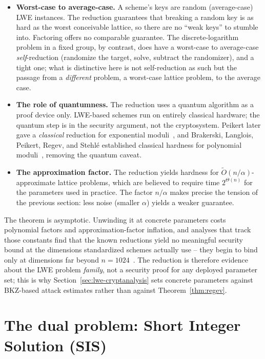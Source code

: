 \begin{itemize}
  \item \textbf{Worst-case to average-case.} A scheme's keys are random (average-case) LWE instances. The reduction guarantees that breaking a random key is as hard as the worst conceivable lattice, so there are no ``weak keys'' to stumble into. Factoring offers no comparable guarantee. The discrete-logarithm problem in a fixed group, by contrast, does have a worst-case to average-case \emph{self}-reduction (randomize the target, solve, subtract the randomizer), and a tight one; what is distinctive here is not self-reduction as such but the passage from a \emph{different} problem, a worst-case lattice problem, to the average case.
  \item \textbf{The role of quantumness.} The reduction uses a quantum algorithm as a proof device only. LWE-based schemes run on entirely classical hardware; the quantum step is in the security argument, not the cryptosystem. Peikert later gave a \emph{classical} reduction for exponential moduli~\cite{peikert2009}, and Brakerski, Langlois, Peikert, Regev, and Stehl\'{e} established classical hardness for polynomial moduli~\cite{blprs2013}, removing the quantum caveat.
  \item \textbf{The approximation factor.} The reduction yields hardness for $\widetilde{O}(n/\alpha)$-approximate lattice problems, which are believed to require time $2^{\Theta(n)}$ for the parameters used in practice. The factor $n/\alpha$ makes precise the tension of the previous section: less noise (smaller $\alpha$) yields a weaker guarantee.
\end{itemize}

\begin{remark}
The theorem is asymptotic. Unwinding it at concrete parameters costs polynomial
factors and approximation-factor inflation, and analyses that track those
constants find that the known reductions yield no meaningful security bound at
the dimensions standardized schemes actually use -- they begin to bind only at
dimensions far beyond $n=1024$~\cite{gartner2023}. The reduction is therefore
evidence about the LWE problem \emph{family}, not a security proof for any
deployed parameter set; this is why Section~\ref{sec:lwe-cryptanalysis} sets
concrete parameters against BKZ-based attack estimates rather than against
Theorem~\ref{thm:regev}.
\end{remark}

\section{The dual problem: Short Integer Solution (SIS)}
\label{sec:sis}

